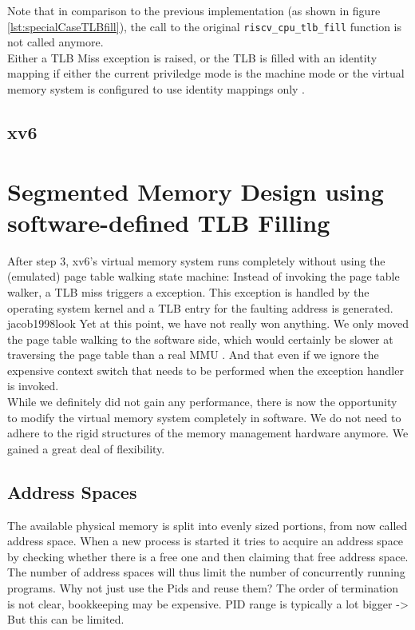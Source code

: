 Note that in comparison to the previous implementation (as shown in figure \ref{lst:specialCaseTLBfill}), the
call to the original \texttt{riscv\_cpu\_tlb\_fill} function is not called anymore.\\
Either a TLB Miss exception is raised, or the TLB is filled with an identity mapping if either the current
priviledge mode is the machine mode or the virtual memory system is configured to use identity mappings only
\cite{RISCVInstructionSet}.



\subsection{xv6}



\section{Segmented Memory Design using software-defined TLB Filling}

After step 3, xv6's virtual memory system runs completely without using the (emulated) page table
walking state machine:
Instead of invoking the page table walker, a TLB miss triggers a exception. This exception is handled by the
operating system kernel and a TLB entry for the faulting address is generated.\\
jacob1998look
Yet at this point, we have not really won anything. We only moved the page table walking to the software side,
which would certainly be slower at traversing the page table than a real MMU \cite{jacob1998look}. And that
even if we ignore the expensive context switch that needs to be performed when the exception handler is invoked.\\

While we definitely did not gain any performance, there is now the opportunity to modify the virtual memory system
completely in software. We do not need to adhere to the rigid structures \cite{tanenbaumOS} of the memory management hardware anymore.
We gained a great deal of flexibility.
\subsection{Address Spaces}
The available physical memory is split into evenly sized portions, from now called address space.
When a new process is started it tries to acquire an address space by checking whether
there is a free one and then claiming that free address space.
The number of address spaces will thus limit the number of concurrently running programs.
Why not just use the Pids and reuse them? The order of termination is not clear, bookkeeping
may be expensive. PID range is typically a lot bigger -> But this can be limited.
